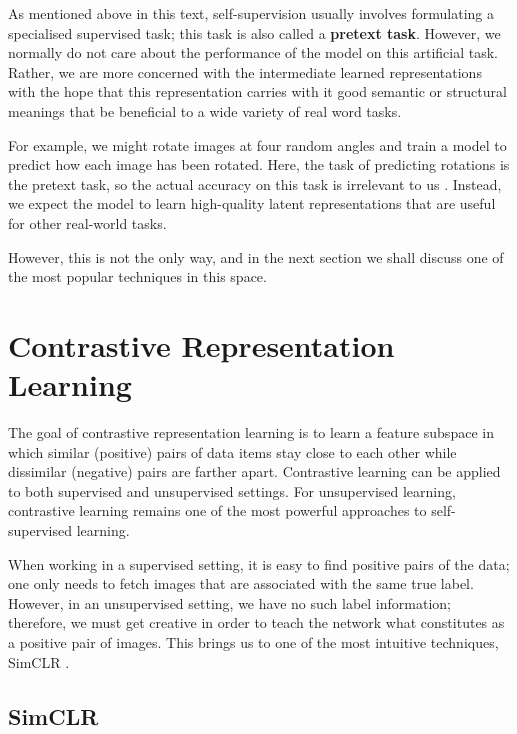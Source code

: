 As mentioned above in this text, self-supervision usually involves formulating a specialised supervised task; this task is also called a \textbf{pretext task}. However, we normally do not care about the performance of the model on this artificial task. Rather, we are more concerned with the intermediate learned representations with the hope that this representation carries with it good semantic or structural meanings that be beneficial to a wide variety of real word tasks.

For example, we might rotate images at four random angles and train a model to predict how each image has been rotated. Here, the task of predicting rotations is the pretext task, so the actual accuracy on this task is irrelevant to us \parencite{gidaris2018unsupervised}. Instead, we expect the model to learn high-quality latent representations that are useful for other real-world tasks.

However, this is not the only way, and in the next section we shall discuss one of the most popular techniques in this space.

\section{Contrastive Representation Learning}\label{sec:contrastive-learning}
The goal of contrastive representation learning is to learn a feature subspace in which similar (positive) pairs of data items stay close to each other while dissimilar (negative) pairs are farther apart. Contrastive learning can be applied to both supervised and unsupervised settings. For unsupervised learning, contrastive learning remains one of the most powerful approaches to self-supervised learning.

When working in a supervised setting, it is easy to find positive pairs of the data; one only needs to fetch images that are associated with the same true label. However, in an unsupervised setting, we have no such label information; therefore, we must get creative in order to teach the network what constitutes as a positive pair of images. This brings us to one of the most intuitive techniques, SimCLR \parencite{chen2020simple}.

\subsection{SimCLR} \label{ssec:simclr}

